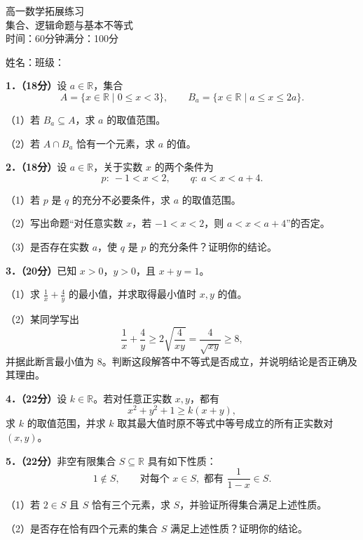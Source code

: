 \documentclass[UTF8,a4paper,12pt]{ctexart}
\newcommand{\subq}[1]{\par\Needspace{3\baselineskip}（#1）}
\begin{document}
\begin{center}{\LARGE 高一数学拓展练习}\\[6pt]集合、逻辑命题与基本不等式\\[4pt]时间：60分钟\qquad 满分：100分\end{center}
姓名：\underline{\hspace{3cm}}\qquad 班级：\underline{\hspace{3cm}}

\textbf{1．（18分）}设 $a\in\mathbb R$，集合
\[A=\{x\in\mathbb R\mid 0\le x<3\},\qquad B_a=\{x\in\mathbb R\mid a\le x\le 2a\}.\]
\subq{1}若 $B_a\subseteq A$，求 $a$ 的取值范围。
\subq{2}若 $A\cap B_a$ 恰有一个元素，求 $a$ 的值。
\par\vspace*{2.4cm}

\textbf{2．（18分）}设 $a\in\mathbb R$，关于实数 $x$ 的两个条件为
\[p:\ -1<x<2,\qquad q:\ a<x<a+4.\]
\subq{1}若 $p$ 是 $q$ 的充分不必要条件，求 $a$ 的取值范围。
\subq{2}写出命题“对任意实数 $x$，若 $-1<x<2$，则 $a<x<a+4$”的否定。
\subq{3}是否存在实数 $a$，使 $q$ 是 $p$ 的充分条件？证明你的结论。
\par\vspace*{2.4cm}
\textbf{3．（20分）}已知 $x>0$，$y>0$，且 $x+y=1$。
\subq{1}求 $\displaystyle\frac1x+\frac4y$ 的最小值，并求取得最小值时 $x,y$ 的值。
\subq{2}某同学写出
\[\frac1x+\frac4y\ge 2\sqrt{\frac4{xy}}=\frac4{\sqrt{xy}}\ge 8,\]
并据此断言最小值为 $8$。判断这段解答中不等式是否成立，并说明结论是否正确及其理由。
\par\vspace*{2.4cm}
\newpage

\textbf{4．（22分）}设 $k\in\mathbb R$。若对任意正实数 $x,y$，都有
\[x^2+y^2+1\ge k(x+y),\]
求 $k$ 的取值范围，并求 $k$ 取其最大值时原不等式中等号成立的所有正实数对 $(x,y)$。
\par\vspace*{5cm}
\textbf{5．（22分）}非空有限集合 $S\subseteq\mathbb R$ 具有如下性质：
\[1\notin S,\qquad \text{对每个 }x\in S,\text{ 都有 }\frac1{1-x}\in S.\]
\subq{1}若 $2\in S$ 且 $S$ 恰有三个元素，求 $S$，并验证所得集合满足上述性质。
\subq{2}是否存在恰有四个元素的集合 $S$ 满足上述性质？证明你的结论。
\par\vspace*{7cm}
\end{document}
